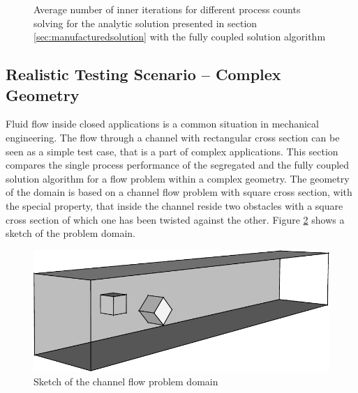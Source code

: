 \begin{figure}[h!]
  \begin{center}
  \end{center}
  \caption{Average number of inner iterations for different process counts solving for the analytic solution presented in section \ref{sec:manufacturedsolution} with the fully coupled solution algorithm}
  \label{fig:weakinner}
\end{figure}

\subsection{Realistic Testing Scenario -- Complex Geometry}
\label{sec:channel}

Fluid flow inside closed applications is a common situation in mechanical engineering. The flow through a channel with rectangular cross section can be seen as a simple test case, that is a part of complex applications. This section compares the single process performance of the segregated and the fully coupled solution algorithm for a flow problem within a complex geometry. The geometry of the domain is based on a channel flow problem with square cross section, with the special property, that inside the channel reside two obstacles with a square cross section of which one has been twisted against the other. Figure \ref{fig:sketch} shows a sketch of the problem domain. 

\begin{figure}
  \centering
  \includegraphics{./img/channel3d.pdf}
  \caption{Sketch of the channel flow problem domain}
  \label{fig:sketch}
\end{figure}

